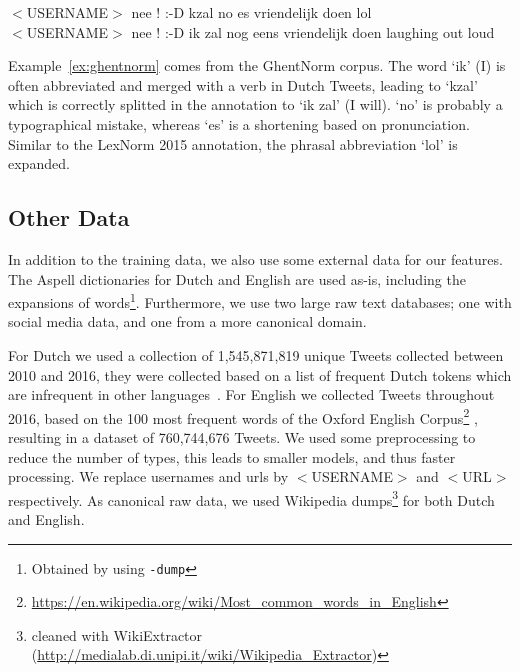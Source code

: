 \documentclass[a4paper,10pt,twoside]{article}
\begin{document}
\begin{exe}
    \ex \gll $<$USERNAME$>$ nee ! :-D kzal no es vriendelijk doen lol \\
     $<$USERNAME$>$ nee ! :-D {ik zal} nog eens vriendelijk doen {laughing out loud} \\
\label{ex:ghentnorm}
\end{exe}

Example~\ref{ex:ghentnorm} comes from the GhentNorm corpus. The word `ik' (I)
is often abbreviated and merged with a verb in Dutch Tweets, leading to `kzal'
which is correctly splitted in the annotation to `ik zal' (I will). `no' is
probably a typographical mistake, whereas `es' is a shortening based on
pronunciation. Similar to the LexNorm 2015 annotation, the phrasal abbreviation
`lol' is expanded.







\subsection{Other Data}
\label{data:other}
In addition to the training data, we also use some external data for our
features. The Aspell dictionaries for Dutch and English are used as-is,
including the expansions of words\footnote{Obtained by using \texttt{-dump}}.
Furthermore, we use two large raw text databases; one with social media data,
and one from a more canonical domain. 

For Dutch we used a collection of 1,545,871,819 unique Tweets collected between
2010 and 2016, they were collected based on a list of frequent Dutch tokens
which are infrequent in other languages~\cite{42}. For English we collected
Tweets throughout 2016, based on the 100 most frequent words of the Oxford
English
Corpus\footnote{\url{https://en.wikipedia.org/wiki/Most_common_words_in_English}}
, resulting in a dataset of 760,744,676 Tweets.  We used some preprocessing to
reduce the number of types, this leads to smaller models, and thus faster
processing. We replace usernames and urls by $<$USERNAME$>$ and $<$URL$>$
respectively.  As canonical raw data, we used Wikipedia dumps\footnote{cleaned
with WikiExtractor
(\url{http://medialab.di.unipi.it/wiki/Wikipedia_Extractor})} for both Dutch
and English.


 
\end{document}
